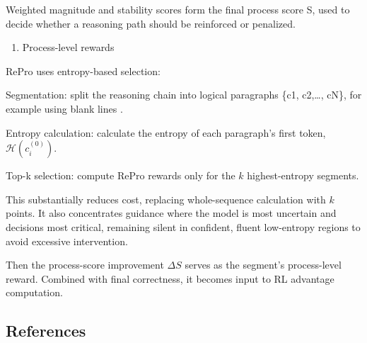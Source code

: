 Weighted magnitude and stability scores form the final process score S, used to decide whether a reasoning path should be reinforced or penalized.

\begin{enumerate}
\def\labelenumi{(\arabic{enumi})}
\setcounter{enumi}{3}
\tightlist
\item
  Process-level rewards
\end{enumerate}

RePro uses entropy-based selection:

Segmentation: split the reasoning chain into logical paragraphs \{c1, c2,\ldots, cN\}, for example using blank lines \n\n.

Entropy calculation: calculate the entropy of each paragraph's first token, \(\mathcal{H}(c_i^{(0)})\).

Top-k selection: compute RePro rewards only for the \(k\) highest-entropy segments.

This substantially reduces cost, replacing whole-sequence calculation with \(k\) points. It also concentrates guidance where the model is most uncertain and decisions most critical, remaining silent in confident, fluent low-entropy regions to avoid excessive intervention.

Then the process-score improvement \(\Delta S\) serves as the segment's process-level reward. Combined with final correctness, it becomes input to RL advantage computation.

\FloatBarrier
{}
\hypertarget{references-83}{%
\subsection{References}\label{references-83}}

